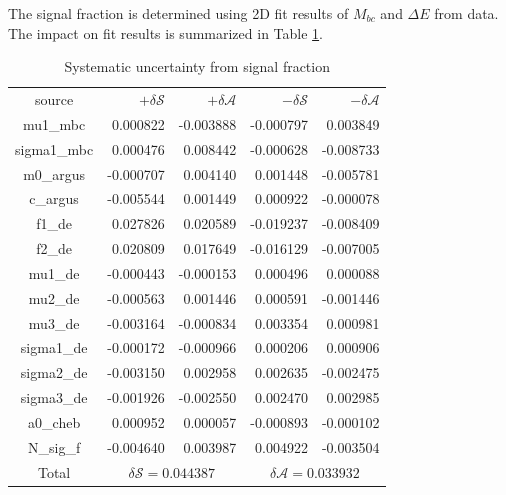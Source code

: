 The signal fraction is determined using 2D fit results of $M_{bc}$ and $\Delta E$ from data. The impact on fit results is summarized in Table \ref{tab:sy_fsig}.
\begin{table}[htpb]
	\begin{minipage}[b]{1.0\linewidth}
		\centering
		\caption{Systematic uncertainty from  signal fraction}
		\label{tab:sy_fsig}
		\begin{tabular}{c r r r r}
			\hline
			source & $+\delta \mathcal{S}$ & $+\delta \mathcal{A}$ & $-\delta \mathcal{S}$ &  $-\delta \mathcal{A}$\\
			mu1\_mbc  & 0.000822 &	-0.003888&	-0.000797&	0.003849
			\\
			sigma1\_mbc & 0.000476 &	0.008442&	-0.000628&	-0.008733
			\\
			m0\_argus & -0.000707&	0.004140	&0.001448&	-0.005781
			\\
			c\_argus & -0.005544&	0.001449&	0.000922&	-0.000078\\
			f1\_de & 0.027826 &	0.020589&	-0.019237	&-0.008409
			\\
			f2\_de & 0.020809&	0.017649	&-0.016129	&-0.007005
			\\
			mu1\_de & -0.000443&	-0.000153&	0.000496&	0.000088\\
			mu2\_de & -0.000563&	0.001446&	0.000591&	-0.001446
			\\
			mu3\_de & -0.003164&	-0.000834&	0.003354&	0.000981
			\\
			sigma1\_de& -0.000172&	-0.000966&	0.000206&	0.000906
			\\
			sigma2\_de& -0.003150&	0.002958&	0.002635&	-0.002475
			\\
			sigma3\_de& -0.001926&	-0.002550&	0.002470&	0.002985
			\\
			a0\_cheb & 0.000952&	0.000057&	-0.000893&	-0.000102
			\\
			N\_sig\_f & -0.004640&	0.003987&	0.004922&	-0.003504
			\\
			\hline
			Total &
			\multicolumn{2}{c}{$\delta \mathcal{S}=0.044387$} &
			\multicolumn{2}{c}{$\delta \mathcal{A}=0.033932$}\\
			\hline
		\end{tabular}
	\end{minipage}
\end{table}

